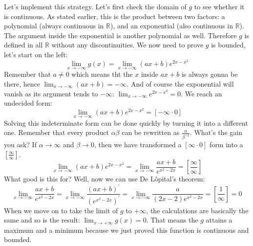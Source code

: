 Let's implement this strategy. Let's first check the domain of $g$
to see whether it is continuous. As stated earlier, this is the product
between two factors: a polynomial (always continuous in $\mathbb{R}$),
and an exponential (also continuous in $\mathbb{R}$). The argument
inside the exponential is another polynomial as well. Therefore
$g$ is defined in all $\mathbb{R}$ without any discontinuities.
We now need to prove $g$ is bounded, let's start on the left:
\begin{equation*}
    \lim_{x \to -\infty} g(x) = \lim_{x \to -\infty} (ax + b)e^{2x - x^2}
\end{equation*}
Remember that $a \neq 0$ which means tht the $x$ inside $ax + b$ is
always gonna be there, hence $\lim_{x \to -\infty} (ax + b) = -\infty$.
And of course the exponential will vanish as its argument tends
to $-\infty$: $\lim_{x \to -\infty} e^{2x - x^2} = 0$. We reach
an undecided form:
\begin{equation*}
    \lim_{x \to -\infty} (ax + b)e^{2x - x^2} =
        [-\infty \cdot 0]
\end{equation*}
Solving this indeterminate form can be done quickly by turning it into
a different one. Remember that every product $\alpha \beta$ can be
rewritten as $\frac{\alpha}{\beta^{-1}}$. What's the gain you ask?
If $\alpha \to \infty$ and $\beta \to 0$, then we have transformed a
$[\infty \cdot 0]$ form into a $[\frac{\infty}{\infty}]$.
\begin{equation*}
    \lim_{x \to -\infty} (ax + b)e^{2x - x^2} =
    \lim_{x \to -\infty} \frac{ax + b}{e^{x^2 - 2x}} =
    \left[\frac{\infty}{\infty}\right]
\end{equation*}
What good is this for? Well, now we can use De L\^{o}pital's
theorem:
\begin{equation*}
    \lim_{x \to -\infty} \frac{ax + b}{e^{x^2 - 2x}} =
    \lim_{x \to -\infty} \frac{(ax + b)^\prime}{\left( e^{x^2 - 2x} \right)^\prime} =
    \lim_{x \to -\infty} \frac{a}{(2x - 2)e^{x^2 - 2x}} =
    \left[\frac{1}{\infty}\right] = 0
\end{equation*}
When we move on to take the limit of $g$ to $+\infty$,
the calculations are basically
the same and so is the result: $\lim_{x \to +\infty} g(x) = 0$.
That means the $g$ attains a maximum and a minimum because we just proved this
function is continuous and bounded.

